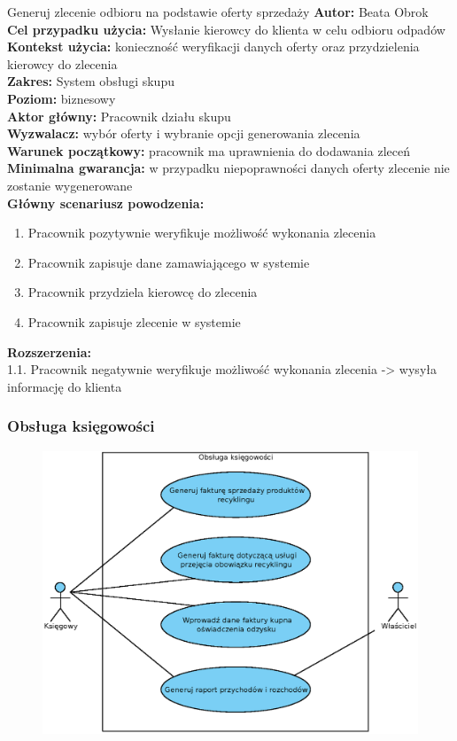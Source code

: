 	\begin{usecase}{Generuj zlecenie odbioru na podstawie oferty sprzedaży}
		\textbf{Autor:} Beata Obrok \\
		\textbf{Cel przypadku użycia:} Wysłanie kierowcy do klienta w celu odbioru odpadów \\
		\textbf{Kontekst użycia:} konieczność weryfikacji danych oferty oraz przydzielenia kierowcy do zlecenia \\
		\textbf{Zakres:} System obsługi skupu \\
		\textbf{Poziom:} biznesowy \\
		\textbf{Aktor główny:} Pracownik działu skupu\\
		\textbf{Wyzwalacz:} wybór oferty i wybranie opcji generowania zlecenia \\
		\textbf{Warunek początkowy:} pracownik ma uprawnienia do dodawania zleceń \\
		\textbf{Minimalna gwarancja:} w przypadku niepoprawności danych oferty zlecenie nie zostanie wygenerowane \\
		\textbf{Główny scenariusz powodzenia:} \\
			\begin{enumerate}
				\item Pracownik pozytywnie weryfikuje możliwość wykonania zlecenia
				\item Pracownik zapisuje dane zamawiającego w systemie
				\item Pracownik przydziela kierowcę do zlecenia
				\item Pracownik zapisuje zlecenie w systemie
			\end{enumerate}
		\textbf{Rozszerzenia:} \\
				1.1. Pracownik negatywnie weryfikuje możliwość wykonania zlecenia -> wysyła informację do klienta
	\end{usecase}

\subsubsection{Obsługa księgowości}
	\begin{figure}[H]
		\centering
		\includegraphics[width=\textwidth]{img/UC/ksiegowosc.eps}
	\end{figure}

